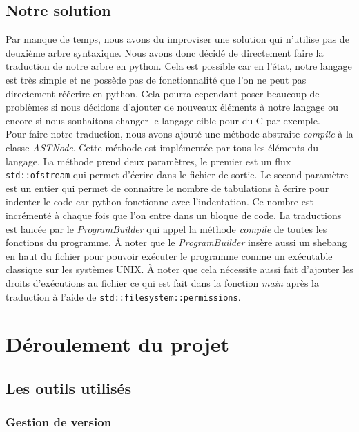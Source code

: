 \documentclass[a4paper]{article}%
\begin{document}
\subsection{Notre solution}

Par manque de temps, nous avons du improviser une solution qui n'utilise pas de
deuxième arbre syntaxique. Nous avons donc décidé de directement faire la
traduction de notre arbre en python. Cela est possible car en l'état, notre
langage est très simple et ne possède pas de fonctionnalité que l'on ne peut pas
directement réécrire en python. Cela pourra cependant poser beaucoup de
problèmes si nous décidons d'ajouter de nouveaux éléments à notre langage ou
encore si nous souhaitons changer le langage cible pour du C par exemple.\\

Pour faire notre traduction, nous avons ajouté une méthode abstraite
\textit{compile} à la classe \textit{ASTNode}. Cette méthode est implémentée par
tous les éléments du langage. La méthode prend deux paramètres, le premier est un
flux \lstinline{std::ofstream} qui permet d'écrire dans le fichier de sortie. Le
second paramètre est un entier qui permet de connaitre le nombre de tabulations
à écrire pour indenter le code car python fonctionne avec l'indentation. Ce
nombre est incrémenté à chaque fois que l'on entre dans un bloque de code. La
traductions est lancée par le \textit{ProgramBuilder} qui appel la méthode
\textit{compile} de toutes les fonctions du programme. À noter que le
\textit{ProgramBuilder} insère aussi un \gls{shebang} en haut du fichier pour
pouvoir exécuter le programme comme un exécutable classique sur les systèmes
UNIX. À noter que cela nécessite aussi fait d'ajouter les droits d'exécutions au
fichier ce qui est fait dans la fonction \textit{main} après la traduction à
l'aide de \lstinline{std::filesystem::permissions}.

\section{Déroulement du projet}

\subsection{Les outils utilisés}

\subsubsection{Gestion de version}
\end{document}
